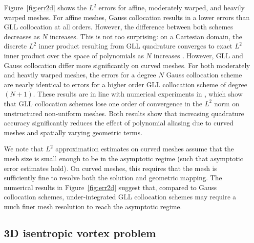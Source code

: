 \documentclass[review,onefignum,onetabnum,final]{siamart171218}
\newcommand{\note}[1]{{\color{blue}{#1}}}
\begin{document}
Figure~\ref{fig:err2d} shows the $L^2$ errors for affine, moderately warped, and heavily warped meshes.  For affine meshes, Gauss collocation results in a lower errors than GLL collocation at all orders.  However, the difference between both schemes decreases as $N$ increases.  This is not too surprising: on a Cartesian domain, the discrete $L^2$ inner product resulting from GLL quadrature converges to exact $L^2$ inner product over the space of polynomials as $N$ increases \cite{quarteroni1994introduction}.  However, GLL and Gauss collocation differ more significantly on curved meshes.  For both moderately and heavily warped meshes, the errors for a degree $N$ Gauss collocation scheme are nearly identical to errors for a higher order GLL collocation scheme of degree $(N+1)$.  These results are in line with numerical experiments in \cite{parsani2016entropy}, which show that GLL collocation schemes lose one order of convergence in the $L^2$ norm on unstructured non-uniform meshes.  Both results show that increasing quadrature accuracy significantly reduces the effect of polynomial aliasing due to curved meshes and spatially varying geometric terms.  

We note that $L^2$ approximation estimates on curved meshes \cite{lenoir1986optimal, bernardi1989optimal, warburton2013low} assume that the mesh size is small enough to be in the asymptotic regime (such that asymptotic error estimates hold).  On curved meshes, this requires that the mesh is sufficiently fine to resolve both the solution and geometric mapping.   The numerical results in Figure~\ref{fig:err2d} suggest that, compared to Gauss collocation schemes, under-integrated GLL collocation schemes may require a much finer mesh resolution to reach the asymptotic regime.  


\subsection{3D isentropic vortex problem}
\end{document}
